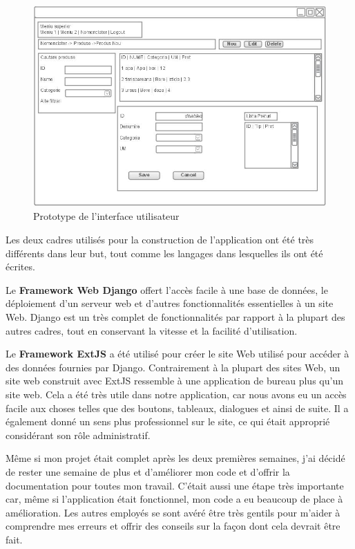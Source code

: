 \documentclass[a4paper,10pt]{report}
\begin{document}
\begin{figure}[ht!]
    \centering
	\caption{Prototype de l'interface utilisateur}
	\includegraphics[scale=0.5]{img/ui.jpg}
\end{figure}

Les deux cadres utilisés pour la construction de l'application ont été très différents
dans leur but, tout comme les langages dans lesquelles ils ont été écrites.

Le \textbf{Framework Web Django} offert l'accès facile à une base de données, le déploiement
d'un serveur web et d'autres fonctionnalités essentielles à un site Web. Django
est un très complet de fonctionnalités par rapport à la plupart des autres cadres,
tout en conservant la vitesse et la facilité d'utilisation.

Le \textbf{Framework ExtJS} a été utilisé pour créer le site Web utilisé pour accéder
à des données fournies par Django. Contrairement à la plupart des sites Web, un site
web construit avec ExtJS ressemble à une application de bureau plus qu'un site web.
Cela a été très utile dans notre application, car nous avons eu un accès facile aux
choses telles que des boutons, tableaux, dialogues et ainsi de suite. Il a également
donné un sens plus professionnel sur le site, ce qui était approprié considérant son
rôle administratif.

Même si mon projet était complet après les deux premières semaines, j'ai décidé de
rester une semaine de plus et d'améliorer mon code et d'offrir la documentation pour
toutes mon travail. C'était aussi une étape très importante car, même si l'application
était fonctionnel, mon code a eu beaucoup de place à amélioration. Les autres employés
se sont avéré être très gentils pour m'aider à comprendre mes erreurs et offrir des conseils
sur la façon dont cela devrait être fait.
\end{document}
